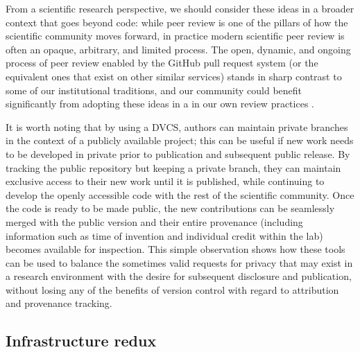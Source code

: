 \documentclass[11pt,oneside,english]{article}
\begin{document}
From a scientific research perspective, we should consider these ideas in a
broader context that goes beyond code: while peer review is one of the pillars
of how the scientific community moves forward, in practice modern scientific
peer review is often an opaque, arbitrary, and limited process.  The open,
dynamic, and ongoing process of peer review enabled by the GitHub pull request
system (or the equivalent ones that exist on other similar services) stands in
sharp contrast to some of our institutional traditions, and our community could
benefit significantly from adopting these ideas in a in our own review
practices \cite{10.3389/fncom.2012.00018}.

It is worth noting that by using a DVCS, authors can maintain private branches
in the context of a publicly available project; this can be useful if new work
needs to be developed in private prior to publication and subsequent public
release. By tracking the public repository but keeping a private branch, they
can maintain exclusive access to their new work until it is published, while
continuing to develop the openly accessible code with the rest of the
scientific community. Once the code is ready to be made public, the new
contributions can be seamlessly merged with the public version and their entire
provenance (including information such as time of invention and individual
credit within the lab) becomes available for inspection.  This simple
observation shows how these tools can be used to balance the sometimes valid
requests for privacy that may exist in a research environment with the desire
for subsequent disclosure and publication, without losing any of the benefits
of version control with regard to attribution and provenance tracking.

\subsection{Infrastructure redux}
\end{document}
